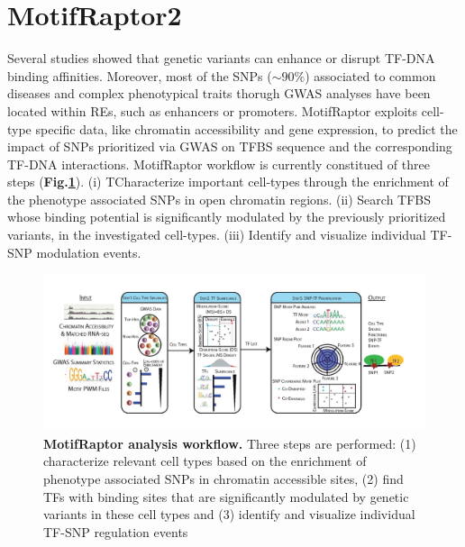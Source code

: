 \documentclass[a4paper, titlepage, openright]{book}
\begin{document}
\section{MotifRaptor2}
Several studies showed that genetic variants can enhance or disrupt TF-DNA binding affinities. Moreover, most of the SNPs ($\sim90\%$) associated to common diseases and complex phenotypical traits thorugh GWAS analyses have been located within REs, such as enhancers or promoters. MotifRaptor exploits cell-type specific data, like chromatin accessibility and gene expression, to predict the impact of SNPs prioritized via GWAS on TFBS sequence and the corresponding TF-DNA interactions. MotifRaptor workflow is currently constitued of three steps (\textbf{Fig.\ref{fig:motifraptor1}}). (i) TCharacterize important cell-types through the enrichment of the phenotype associated SNPs in open chromatin regions. (ii) Search TFBS whose binding potential is significantly modulated by the previously prioritized variants, in the investigated cell-types. (iii) Identify and visualize individual TF-SNP modulation events. 
\begin{figure}
	\centering
	\includegraphics[width=\textwidth]{figures/motifraptor1.jpg}
	\caption[MotifRaptor analysis workflow]{\textbf{MotifRaptor analysis workflow.} Three steps are performed: (1) characterize
relevant cell types based on the enrichment of phenotype associated SNPs in chromatin accessible
sites, (2) find TFs with binding sites that are significantly modulated by genetic variants in these
cell types and (3) identify and visualize individual TF-SNP regulation events}
	\label{fig:motifraptor1}
\end{figure} 
\end{document}
